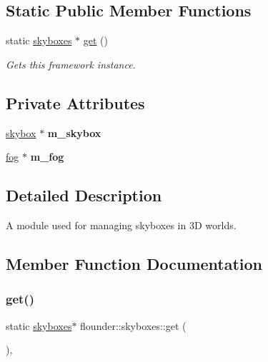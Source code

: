 \subsection*{Static Public Member Functions}
\begin{DoxyCompactItemize}
\item 
static \hyperlink{classflounder_1_1skyboxes}{skyboxes} $\ast$ \hyperlink{classflounder_1_1skyboxes_a07d7f073ed0899414f7f4e1f719e6406}{get} ()
\begin{DoxyCompactList}\small\item\em Gets this framework instance. \end{DoxyCompactList}\end{DoxyCompactItemize}
\subsection*{Private Attributes}
\begin{DoxyCompactItemize}
\item 
\mbox{\label{classflounder_1_1skyboxes_ac1283efff66b16876d01d32f02b3dcfc}} 
\hyperlink{classflounder_1_1skybox}{skybox} $\ast$ {\bfseries m\+\_\+skybox}
\item 
\mbox{\label{classflounder_1_1skyboxes_a52ab1626cd98237d23a2a496a8b0daa8}} 
\hyperlink{classflounder_1_1fog}{fog} $\ast$ {\bfseries m\+\_\+fog}
\end{DoxyCompactItemize}


\subsection{Detailed Description}
A module used for managing skyboxes in 3D worlds. 



\subsection{Member Function Documentation}
\mbox{\label{classflounder_1_1skyboxes_a07d7f073ed0899414f7f4e1f719e6406}} 
\subsubsection{\texorpdfstring{get()}{get()}}
{\footnotesize\ttfamily static \hyperlink{classflounder_1_1skyboxes}{skyboxes}$\ast$ flounder\+::skyboxes\+::get (\begin{DoxyParamCaption}{ }\end{DoxyParamCaption})\hspace{0.3cm}{\ttfamily [inline]}, {\ttfamily [static]}}



